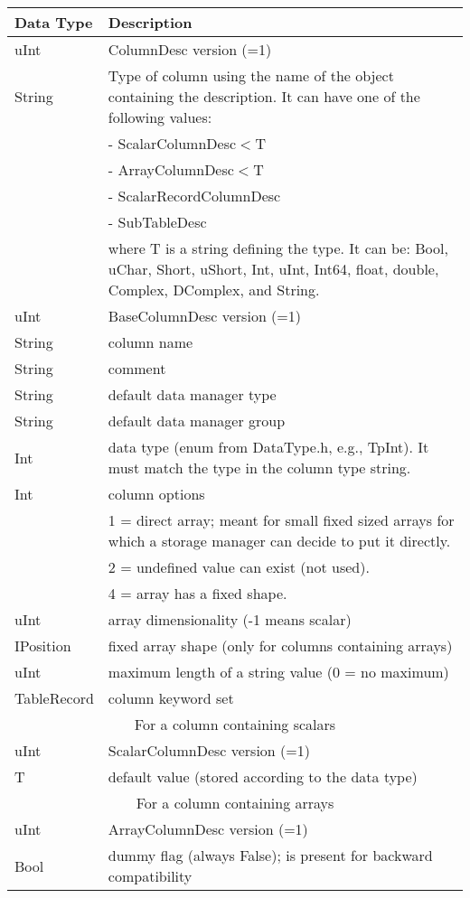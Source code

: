 \vspace{0.15in}
\begin{tabular}{|l|p{13cm}|} \hline
  Data Type & Description \\ \hline\hline
  uInt & ColumnDesc version (=1) \\
  String & Type of column using the name of the object containing the
  description. It can have one of the following values:
  \tabularnewline & - ScalarColumnDesc$<$T
  \tabularnewline & - ArrayColumnDesc$<$T
  \tabularnewline & - ScalarRecordColumnDesc
  \tabularnewline & - SubTableDesc
  \tabularnewline & where T is a string defining the type. It can be:
  Bool, uChar, Short, uShort, Int, uInt, Int64, float, double, Complex, DComplex,
  and String. \\
  \hline
  uInt & BaseColumnDesc version (=1) \\
  String & column name \\
  String & comment \\
  String & default data manager type \\
  String & default data manager group \\
  Int & data type (enum from DataType.h, e.g., TpInt). It must match the type
  in the column type string. \\
  Int & column options
  \tabularnewline & 1 = direct array; meant for small fixed sized
  arrays for which a storage manager can decide to put it directly.
  \tabularnewline & 2 = undefined value can exist (not used).
  \tabularnewline & 4 = array has a fixed shape. \\
  uInt & array dimensionality (-1 means scalar) \\
  IPosition & fixed array shape (only for columns containing arrays) \\
  uInt & maximum length of a string value (0 = no maximum) \\
  TableRecord & column keyword set \\
  \hline
  \multicolumn{2}{|c|}{For a column containing scalars} \\
  \hline
  uInt & ScalarColumnDesc version (=1) \\
  T & default value (stored according to the data type) \\
  \hline
  \multicolumn{2}{|c|}{For a column containing arrays} \\
  \hline
  uInt & ArrayColumnDesc version (=1) \\
  Bool & dummy flag (always False); is present for backward compatibility \\

\end{tabular}
